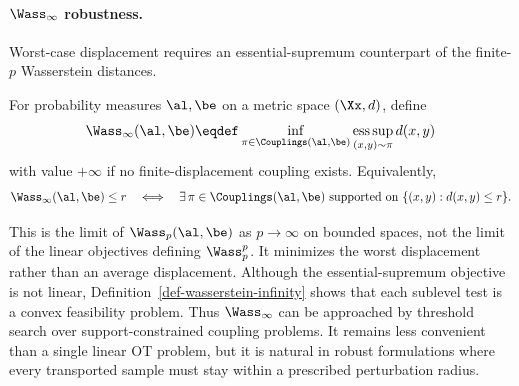 \paragraph{\texorpdfstring{$\Wass_\infty$}{W-infinity} robustness.}

Worst-case displacement requires an essential-supremum counterpart of the finite-$p$ Wasserstein distances.
\begin{defn}\label{def-wasserstein-infinity}
For probability measures $\al,\be$ on a metric space $(\Xx,d)$, define
\begin{equation}\label{eq-wass-infty}
	\Wass_\infty(\al,\be)
	\eqdef
	\inf_{\pi\in\Couplings(\al,\be)}
	\operatorname*{ess\,sup}_{(x,y)\sim\pi} d(x,y)
\end{equation}
with value $+\infty$ if no finite-displacement coupling exists.
Equivalently,
\[
	\Wass_\infty(\al,\be)\leq r
	\quad\Longleftrightarrow\quad
	\exists\,\pi\in\Couplings(\al,\be)
	\text{ supported on }\{(x,y):d(x,y)\leq r\}.
\]
\end{defn}
This is the limit of $\Wass_p(\al,\be)$ as $p\to\infty$ on bounded spaces, not the limit of the linear objectives defining $\Wass_p^p$. It minimizes the worst displacement rather than an average displacement. Although the essential-supremum objective is not linear, Definition~\ref{def-wasserstein-infinity} shows that each sublevel test is a convex feasibility problem.
Thus $\Wass_\infty$ can be approached by threshold search over support-constrained coupling problems. It remains less convenient than a single linear OT problem, but it is natural in robust formulations where every transported sample must stay within a prescribed perturbation radius.

